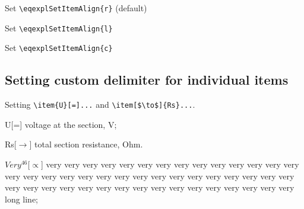 \documentclass{article}
\begin{document}
\noindent Set \verb+\eqexplSetItemAlign{r}+ (default)

\begin{eqexpl}
  \testList
\end{eqexpl}

\vspace{5mm}

\noindent Set \verb+\eqexplSetItemAlign{l}+

\begin{eqexpl}
  \testList
\end{eqexpl}

\vspace{5mm}

\noindent Set \verb+\eqexplSetItemAlign{c}+

\begin{eqexpl}
  \testList
\end{eqexpl}


\subsection{Setting custom delimiter for individual items}

\noindent Setting \verb+\item{U}[=]...+ and
\verb+\item[$\to$]{Rs}...+.

\begin{eqexpl}
  \item{U}[=] voltage at the section, V;
  \item{Rs}[$\to$] total section resistance, Ohm.
  \item{$Very^{46}$}[$\propto$] very very very very very very very
    very very very very very very very very very very very very very
    very very very very very very very very very very very very very
    very very very very very very very very very very very very very
    long line;
\end{eqexpl}
\end{document}
